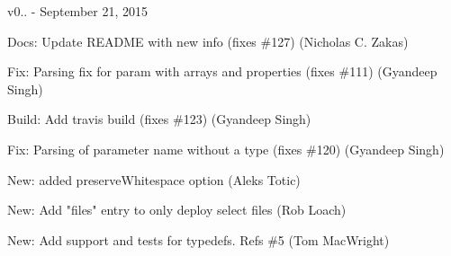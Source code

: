 v0.. -\/ September 21, 2015


\begin{DoxyItemize}
\item Docs\+: Update README with new info (fixes \#127) (Nicholas C. Zakas)
\item Fix\+: Parsing fix for param with arrays and properties (fixes \#111) (Gyandeep Singh)
\item Build\+: Add travis build (fixes \#123) (Gyandeep Singh)
\item Fix\+: Parsing of parameter name without a type (fixes \#120) (Gyandeep Singh)
\item New\+: added preserve\+Whitespace option (Aleks Totic)
\item New\+: Add "{}files"{} entry to only deploy select files (Rob Loach)
\item New\+: Add support and tests for typedefs. Refs \#5 (Tom Mac\+Wright) 
\end{DoxyItemize}